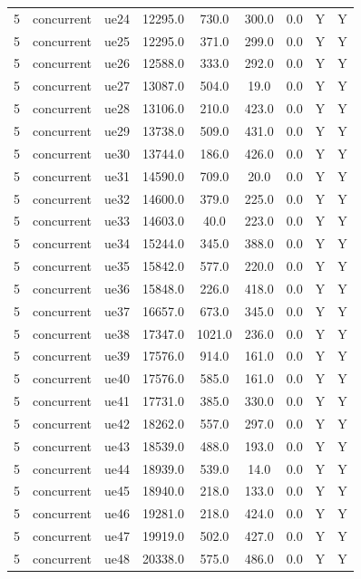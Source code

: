 \begin{table}[ht]
\begin{tabular}{|c|c|c|c|c|c|c|c|c|}
5 & concurrent & ue24 & 12295.0 & 730.0 & 300.0 & 0.0 & Y & Y \\
5 & concurrent & ue25 & 12295.0 & 371.0 & 299.0 & 0.0 & Y & Y \\
5 & concurrent & ue26 & 12588.0 & 333.0 & 292.0 & 0.0 & Y & Y \\
5 & concurrent & ue27 & 13087.0 & 504.0 & 19.0 & 0.0 & Y & Y \\
5 & concurrent & ue28 & 13106.0 & 210.0 & 423.0 & 0.0 & Y & Y \\
5 & concurrent & ue29 & 13738.0 & 509.0 & 431.0 & 0.0 & Y & Y \\
5 & concurrent & ue30 & 13744.0 & 186.0 & 426.0 & 0.0 & Y & Y \\
5 & concurrent & ue31 & 14590.0 & 709.0 & 20.0 & 0.0 & Y & Y \\
5 & concurrent & ue32 & 14600.0 & 379.0 & 225.0 & 0.0 & Y & Y \\
5 & concurrent & ue33 & 14603.0 & 40.0 & 223.0 & 0.0 & Y & Y \\
5 & concurrent & ue34 & 15244.0 & 345.0 & 388.0 & 0.0 & Y & Y \\
5 & concurrent & ue35 & 15842.0 & 577.0 & 220.0 & 0.0 & Y & Y \\
5 & concurrent & ue36 & 15848.0 & 226.0 & 418.0 & 0.0 & Y & Y \\
5 & concurrent & ue37 & 16657.0 & 673.0 & 345.0 & 0.0 & Y & Y \\
5 & concurrent & ue38 & 17347.0 & 1021.0 & 236.0 & 0.0 & Y & Y \\
5 & concurrent & ue39 & 17576.0 & 914.0 & 161.0 & 0.0 & Y & Y \\
5 & concurrent & ue40 & 17576.0 & 585.0 & 161.0 & 0.0 & Y & Y \\
5 & concurrent & ue41 & 17731.0 & 385.0 & 330.0 & 0.0 & Y & Y \\
5 & concurrent & ue42 & 18262.0 & 557.0 & 297.0 & 0.0 & Y & Y \\
5 & concurrent & ue43 & 18539.0 & 488.0 & 193.0 & 0.0 & Y & Y \\
5 & concurrent & ue44 & 18939.0 & 539.0 & 14.0 & 0.0 & Y & Y \\
5 & concurrent & ue45 & 18940.0 & 218.0 & 133.0 & 0.0 & Y & Y \\
5 & concurrent & ue46 & 19281.0 & 218.0 & 424.0 & 0.0 & Y & Y \\
5 & concurrent & ue47 & 19919.0 & 502.0 & 427.0 & 0.0 & Y & Y \\
5 & concurrent & ue48 & 20338.0 & 575.0 & 486.0 & 0.0 & Y & Y \\

\end{tabular}
\end{table}
